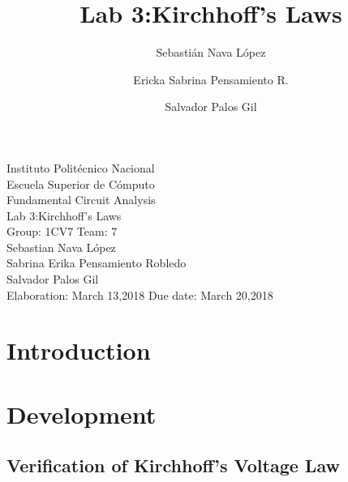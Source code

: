 \documentclass[a4paper]{article}
\title{Lab 3:Kirchhoff's Laws}
\author{
    Sebastián Nava López\\
    \and
    Ericka Sabrina Pensamiento R.\\
    \and
    Salvador Palos Gil
}
\begin{document}
\begin{titlepage}
    \centering
    {\Huge Instituto Politécnico Nacional}\\[3ex]
    {\huge Escuela Superior de Cómputo}\\[8ex]
    {\huge Fundamental Circuit Analysis}\\[12ex]
    {\Large Lab 3:Kirchhoff's Laws}\\[20ex]
    {\Large Group: 1CV7 Team: 7 \\[8ex]
    Sebastian Nava López\\[4ex]
    Sabrina Erika Pensamiento Robledo\\[4ex]
    Salvador Palos Gil\\[18ex]
    }
    \large{Elaboration: March 13,2018\hspace{8em} Due date: March 20,2018}
\end{titlepage}
\tableofcontents
\newpage
\section{Introduction}
\newpage
\section{Development}
\subsection{Verification of Kirchhoff's Voltage Law}
\end{document}
